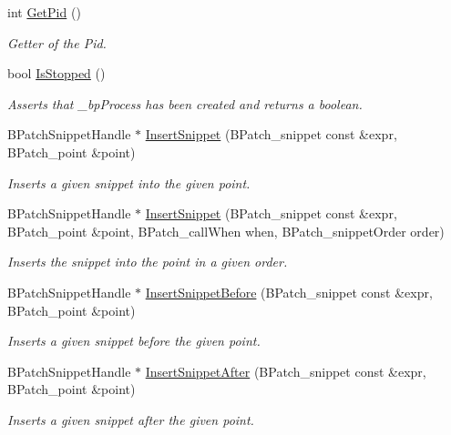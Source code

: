 \begin{DoxyCompactItemize}
\item 
int \hyperlink{class_di_process_ad83360d6f92a6ef991ad44075964fa85}{Get\-Pid} ()
\begin{DoxyCompactList}\small\item\em Getter of the Pid. \end{DoxyCompactList}\item 
bool \hyperlink{class_di_process_a2e92f5f654ba4d0bc9f495cd58c571b2}{Is\-Stopped} ()
\begin{DoxyCompactList}\small\item\em Asserts that \-\_\-bp\-Process has been created and returns a boolean. \end{DoxyCompactList}\item 
B\-Patch\-Snippet\-Handle $\ast$ \hyperlink{class_di_process_a3dc12883c432036edb7ea980ccdfa7d3}{Insert\-Snippet} (B\-Patch\-\_\-snippet const \&expr, B\-Patch\-\_\-point \&point)
\begin{DoxyCompactList}\small\item\em Inserts a given snippet into the given point. \end{DoxyCompactList}\item 
B\-Patch\-Snippet\-Handle $\ast$ \hyperlink{class_di_process_a3d0cdbd8bae78306b311b03403e7fa8d}{Insert\-Snippet} (B\-Patch\-\_\-snippet const \&expr, B\-Patch\-\_\-point \&point, B\-Patch\-\_\-call\-When when, B\-Patch\-\_\-snippet\-Order order)
\begin{DoxyCompactList}\small\item\em Inserts the snippet into the point in a given order. \end{DoxyCompactList}\item 
B\-Patch\-Snippet\-Handle $\ast$ \hyperlink{class_di_process_aec944980cc04cb6e05f2b033971d819e}{Insert\-Snippet\-Before} (B\-Patch\-\_\-snippet const \&expr, B\-Patch\-\_\-point \&point)
\begin{DoxyCompactList}\small\item\em Inserts a given snippet before the given point. \end{DoxyCompactList}\item 
B\-Patch\-Snippet\-Handle $\ast$ \hyperlink{class_di_process_af381488cf52e8a790b0476c1d4da9c4f}{Insert\-Snippet\-After} (B\-Patch\-\_\-snippet const \&expr, B\-Patch\-\_\-point \&point)
\begin{DoxyCompactList}\small\item\em Inserts a given snippet after the given point. \end{DoxyCompactList}\item 

\end{DoxyCompactItemize}
